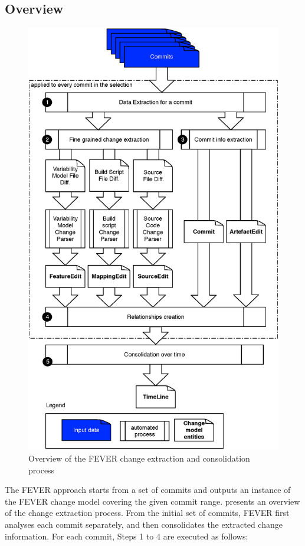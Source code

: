 \subsection{Overview}

\begin{figure}[h]
	\centering
	\includegraphics[scale=0.35]{extraction_overview.eps}
	\caption{Overview of the FEVER change extraction and consolidation process}
	\label{fig:overview}
\end{figure}
The FEVER approach starts from a set of commits and outputs an instance of the FEVER change model covering the given commit range.
 presents an overview of the change extraction process.
From the initial set of commits, FEVER first analyses each commit separately, and then consolidates the extracted change information.
For each commit, Steps 1 to 4 are executed as follows:

